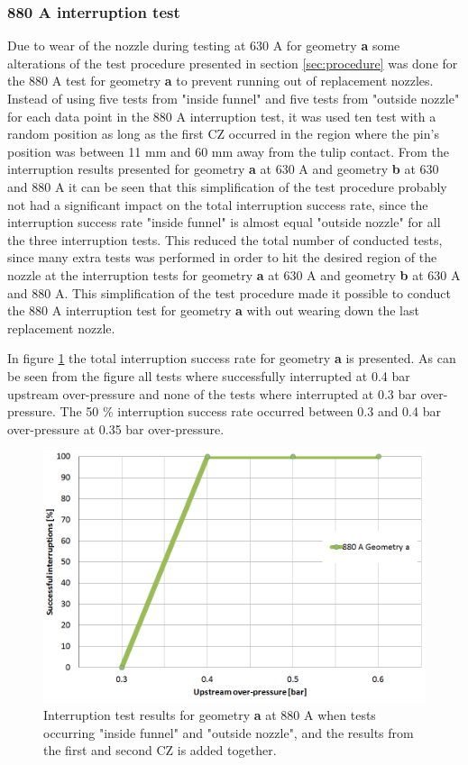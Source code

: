 \documentclass[10pt,b5paper,twoside]{article}
\begin{document}
\subsubsection*{880 A interruption test}
Due to wear of the nozzle during testing at 630 A for geometry \textbf{a} some alterations of the test procedure presented in section \ref{sec:procedure} was done for the 880 A test for geometry \textbf{a} to prevent running out of replacement nozzles. Instead of using five tests from "inside funnel" and five tests from "outside nozzle" for each data point in the 880 A interruption test, it was used ten test with a random position as long as the first CZ occurred in the region where the pin's position was between 11 mm and 60 mm away from the tulip contact. From the interruption results presented for geometry \textbf{a} at 630 A and geometry \textbf{b} at 630 and 880 A it can be seen that this simplification of the test procedure probably not had a significant impact on the total interruption success rate, since the interruption success rate "inside funnel" is almost equal "outside nozzle" for all the three interruption tests. This reduced the total number of conducted tests, since many extra tests was performed in order to hit the desired region of the nozzle at the interruption tests for geometry \textbf{a} at 630 A and geometry \textbf{b} at 630 A and 880 A. This simplification of the test procedure made it possible to conduct the 880 A interruption test for geometry \textbf{a} with out wearing down the last replacement nozzle.

In figure \ref{fig:results880AgeoA} the total interruption success rate for geometry \textbf{a} is presented. As can be seen from the figure all tests where successfully interrupted at 0.4 bar upstream over-pressure and none of the tests where interrupted at 0.3 bar over-pressure. The 50 \% interruption success rate occurred between 0.3 and 0.4 bar over-pressure at 0.35 bar over-pressure.


\begin{figure}[H]
\centering
\includegraphics[scale=0.45]{Bilder/Results/geoA880amp.png}
\caption{Interruption test results for geometry \textbf{a} at 880 A when tests occurring "inside funnel" and "outside nozzle", and the results from the first and second CZ is added together.} \label{fig:results880AgeoA}
\end{figure}
\end{document}

